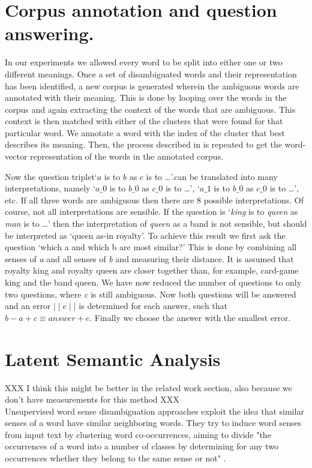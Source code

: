 \documentclass[11pt]{article}
\begin{document}
\section{Corpus annotation and question answering.}
In our experiments we allowed every word to be split into either one or two different meanings.
Once a set of disambiguated words and their representation has been identified, a new corpus is generated wherein the ambiguous words are annotated with their meaning. This is done by looping over the words in the corpus and again extracting the context of the words that are ambiguous. This context is then matched with either of the clusters that were found for that particular word. We annotate a word with the index of the cluster that best describes its meaning. Then, the process described in \cite{Mikolov:13} is repeated to get the word-vector representation of the words in the annotated corpus. 

Now the question triplet`$a$ is to $b$ as $c$ is to \dots'.can be translated into many interpretations, namely `$a\_0$ is to $b\_0 $ as $c\_0 $ is to \dots', `$a\_1$ is to $b\_0 $ as $c\_0 $ is to \dots', etc. If all three words are ambiguous then there are 8 possible interpretations. Of course, not all interpretations are sensible. If the question is `\textit{king} is to \textit{queen} as \textit{man} is to \dots' then the interpretation of \textit{queen} as a band is not sensible, but should be interpreted as `queen as-in royalty'. To achieve this result we first ask the question `which a and which b are most similar?' This is done by combining all senses of \textit{a} and all senses of \textit{b} and measuring their distance. It is assumed that royalty king and royalty queen are closer together than, for example, card-game king and the band queen. We have now reduced the number of questions to only two questions, where \textit{c} is still ambiguous. Now both questions will be answered and an error $\mid\mid \textit{e} \mid\mid$ is determined for each answer, such that $\textit{b} - \textit{a} + \textit{c} \equiv \textit{answer} + \textit{e}$. Finally we choose the answer with the smallest error.

\section{Latent Semantic Analysis}
XXX I think this might be better in the related work section, also because we don't have measurements for this method XXX\\
Unsupervised word sense disambiguation approaches exploit the idea that similar senses of a word have similar neighboring words. They try to induce word senses from input text by clustering word co-occurrences, aiming to divide "the occurrences of a word into a number of classes by determining for any two occurrences whether they belong to the same sense or not" \cite{Schutze:98}.
\end{document}
